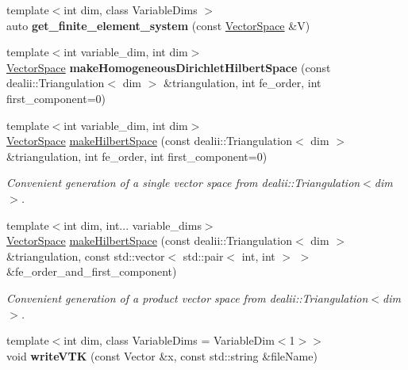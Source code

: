 \begin{DoxyCompactItemize}
\item 
\hypertarget{namespaceSpacy_1_1dealII_ae4b346126212aae19ce54381fe87f556}{{\footnotesize template$<$int dim, class Variable\-Dims $>$ }\\auto {\bfseries get\-\_\-finite\-\_\-element\-\_\-system} (const \hyperlink{classSpacy_1_1VectorSpace}{\-Vector\-Space} \&\-V)}\label{namespaceSpacy_1_1dealII_ae4b346126212aae19ce54381fe87f556}

\item 
\hypertarget{namespaceSpacy_1_1dealII_a84446cd81a46ee9162ea8944f6d92f55}{{\footnotesize template$<$int variable\-\_\-dim, int dim$>$ }\\\hyperlink{classSpacy_1_1VectorSpace}{\-Vector\-Space} {\bfseries make\-Homogeneous\-Dirichlet\-Hilbert\-Space} (const dealii\-::\-Triangulation$<$ dim $>$ \&triangulation, int fe\-\_\-order, int first\-\_\-component=0)}\label{namespaceSpacy_1_1dealII_a84446cd81a46ee9162ea8944f6d92f55}

\item 
{\footnotesize template$<$int variable\-\_\-dim, int dim$>$ }\\\hyperlink{classSpacy_1_1VectorSpace}{\-Vector\-Space} \hyperlink{namespaceSpacy_1_1dealII_a97a92becc85fac6fbf3598ef8ff1ca9c}{make\-Hilbert\-Space} (const dealii\-::\-Triangulation$<$ dim $>$ \&triangulation, int fe\-\_\-order, int first\-\_\-component=0)
\begin{DoxyCompactList}\small\item\em \-Convenient generation of a single vector space from dealii\-::\-Triangulation$<$dim$>$. \end{DoxyCompactList}\item 
{\footnotesize template$<$int dim, int... variable\-\_\-dims$>$ }\\\hyperlink{classSpacy_1_1VectorSpace}{\-Vector\-Space} \hyperlink{namespaceSpacy_1_1dealII_a554fe46c7a1b93af7dae16a6628e517a}{make\-Hilbert\-Space} (const dealii\-::\-Triangulation$<$ dim $>$ \&triangulation, const std\-::vector$<$ std\-::pair$<$ int, int $>$ $>$ \&fe\-\_\-order\-\_\-and\-\_\-first\-\_\-component)
\begin{DoxyCompactList}\small\item\em \-Convenient generation of a product vector space from dealii\-::\-Triangulation$<$dim$>$. \end{DoxyCompactList}\item 
\hypertarget{namespaceSpacy_1_1dealII_a088b66c8b6ada765fb2919d4731512d3}{{\footnotesize template$<$int dim, class Variable\-Dims  = \-Variable\-Dim$<$1$>$$>$ }\\void {\bfseries write\-V\-T\-K} (const \-Vector \&x, const std\-::string \&file\-Name)}\label{namespaceSpacy_1_1dealII_a088b66c8b6ada765fb2919d4731512d3}

\end{DoxyCompactItemize}


